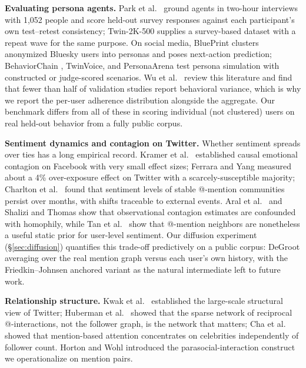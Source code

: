 \documentclass[twocolumn,10pt]{article}
\makeatletter
\newcommand{\paperurlof}[1]{\csname paperurl@#1\endcsname}
\newcommand{\ecite}[1]{\href{\paperurlof{#1}}{\NoHyper\cite{#1}\endNoHyper}}
\makeatother
\begin{document}
\textbf{Evaluating persona agents.} Park et al.\ \ecite{park2024} ground
agents in two-hour interviews with 1{,}052 people and score held-out
survey responses against each participant's own test--retest consistency;
Twin-2K-500 \ecite{twin2k} supplies a survey-based dataset with a repeat
wave for the same purpose. On social media, BluePrint \ecite{blueprint}
clusters anonymized Bluesky users into personas and poses next-action
prediction; BehaviorChain \ecite{behaviorchain}, TwinVoice, and
PersonaArena \ecite{personaarena} test persona simulation with
constructed or judge-scored scenarios. Wu et al.\ \ecite{boundary} review
this literature and find that fewer than half of validation studies
report behavioral variance, which is why we report the per-user
adherence distribution alongside the aggregate. Our benchmark differs
from all of these in scoring individual (not clustered) users on
real held-out behavior from a fully public corpus.

\textbf{Sentiment dynamics and contagion on Twitter.} Whether sentiment
spreads over ties has a long empirical record. Kramer et al.\
\ecite{kramer2014} established causal emotional contagion on Facebook
with very small effect sizes; Ferrara and Yang \ecite{ferrara2015}
measured about a 4\% over-exposure effect on Twitter with a
scarcely-susceptible majority; Charlton et al.\ \ecite{charlton2016}
found that sentiment levels of stable @-mention communities persist over
months, with shifts traceable to external events. Aral et al.\
\ecite{aral2009} and Shalizi and Thomas \ecite{shalizi2011} show that
observational contagion estimates are confounded with homophily, while
Tan et al.\ \ecite{tan2011} show that @-mention neighbors are nonetheless
a useful static prior for user-level sentiment. Our diffusion experiment
(\S\ref{sec:diffusion}) quantifies this trade-off predictively on a public
corpus: DeGroot averaging \ecite{degroot1974} over the real mention graph
versus each user's own history, with the Friedkin--Johnsen anchored
variant \ecite{friedkin1990} as the natural intermediate left to future
work.

\textbf{Relationship structure.} Kwak et al.\ \ecite{kwak2010}
established the large-scale structural view of Twitter; Huberman et al.\
\ecite{huberman2009} showed that the sparse network of reciprocal
@-interactions, not the follower graph, is the network that matters; Cha
et al.\ \ecite{cha2010} showed that mention-based attention concentrates
on celebrities independently of follower count. Horton and Wohl
\ecite{horton1956} introduced the parasocial-interaction construct we
operationalize on mention pairs.
\end{document}
